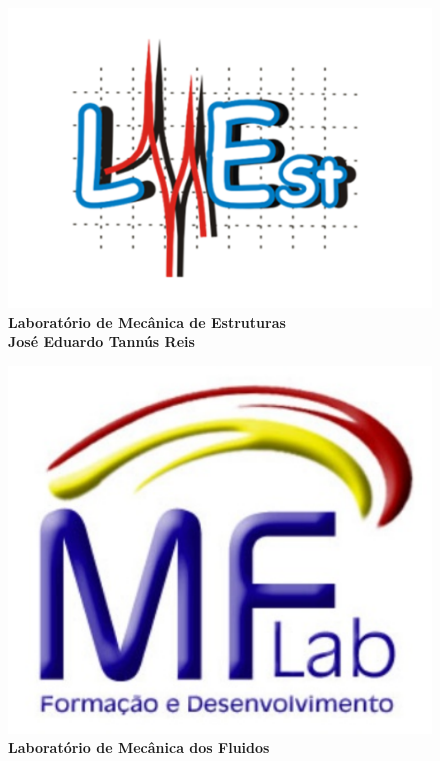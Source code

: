 \documentclass[12pt,fleqn,a4paper]{report}
\begin{document}
\begin{singlespace}
		\begin{figure}[htb]
			\begin{minipage}{0.49\linewidth}
				\centering
				\includegraphics[scale=0.15]{layout_document/lmest.pdf}\\
				{\bf \small{Laborat\'orio de Mec\^anica de Estruturas}} \\
				{\bf \small{Jos\'e Eduardo Tann\'us Reis}}
			\end{minipage}
			\begin{minipage}{0.49\linewidth}
				\centering
				\vspace{-0.15cm}\includegraphics[scale=0.22]{layout_document/mflab.pdf}\\ \vspace{0.15cm}
				{\bf \small{Laborat\'orio de Mec\^anica dos Fluidos}}
			\end{minipage}
		\end{figure}
	
	\end{singlespace}
	
\end{document}
